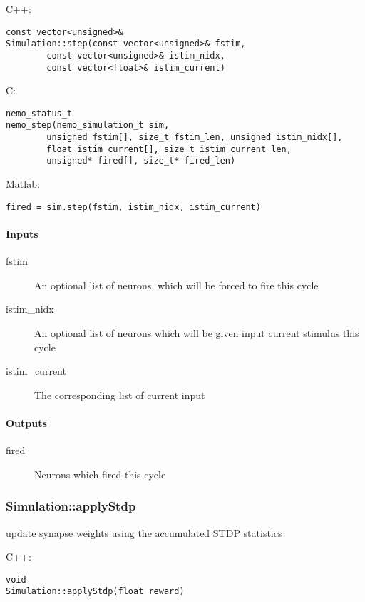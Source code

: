 \noindent C++:
\begin{lstlisting}[aboveskip=2pt]
const vector<unsigned>&
Simulation::step(const vector<unsigned>& fstim, 
        const vector<unsigned>& istim_nidx, 
        const vector<float>& istim_current)
\end{lstlisting}

\noindent C:
\begin{lstlisting}[aboveskip=2pt]
nemo_status_t
nemo_step(nemo_simulation_t sim, 
        unsigned fstim[], size_t fstim_len, unsigned istim_nidx[], 
        float istim_current[], size_t istim_current_len, 
        unsigned* fired[], size_t* fired_len)
\end{lstlisting}

\noindent Matlab:
\begin{lstlisting}[aboveskip=2pt]
fired = sim.step(fstim, istim_nidx, istim_current)
\end{lstlisting}
\paragraph{Inputs}
\begin{description}
\item[fstim] An optional list of neurons, which will be forced to fire this cycle
\item[istim\_nidx] An optional list of neurons which will be given input current stimulus this cycle
\item[istim\_current] The corresponding list of current input
\end{description}
\paragraph{Outputs}
\begin{description}
\item[fired] Neurons which fired this cycle
\end{description}

\clearpage
\subsubsection*{Simulation::applyStdp}
\label{fn: applyStdp}
update synapse weights using the accumulated STDP statistics


\noindent C++:
\begin{lstlisting}[aboveskip=2pt]
void
Simulation::applyStdp(float reward)
\end{lstlisting}

